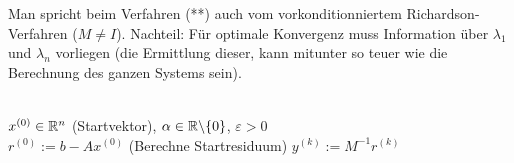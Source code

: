  \begin{bemerkung}
 Man spricht beim Verfahren (**) auch vom vorkonditionniertem Richardson-Verfahren ($M\neq I$). 
 Nachteil: Für optimale Konvergenz muss Information über $\lambda_1$ und $\lambda_n$ vorliegen (die Ermittlung dieser, kann mitunter so teuer wie die Berechnung des ganzen Systems sein).
 \end{bemerkung}

 \begin{algorithmus}
   \begin{algorithmic}
     \\ 
     \Init $x^{(0)}\in \mathbb{R}^n$ (Startvektor), $\alpha\in\mathbb{R} \backslash \{0\}$, $\varepsilon >0$\\

     \State  $r^{(0)} := b-Ax^{(0)}$ (Berechne Startresiduum)
      \State $y^{(k)} := M^{-1} r^{(k)}$
     \EndWhile  
   \end{algorithmic}
 \end{algorithmus}

